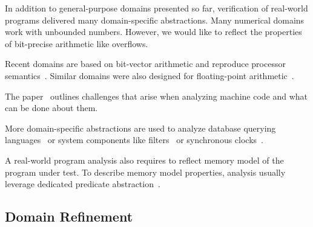 In addition to general-purpose domains presented so far, verification of
real-world programs delivered many domain-specific abstractions. Many numerical
domains work with unbounded numbers. However, we would like to reflect the
properties of bit-precise arithmetic like overflows.

Recent domains are based on bit-vector arithmetic and reproduce processor semantics~\cite{Sharma2013, Sharma2017}. Similar domains were also designed for floating-point arithmetic~\cite{Putot2004}.


The paper~\cite{Reps2010} outlines challenges that arise when analyzing machine code and what can be done about them.

More domain-specific abstractions are used to analyze database querying languages~\cite{Halder2012} or system components like filters~\cite{Feret2004} or synchronous clocks~\cite{Feret2005}.

A real-world program analysis also requires to reflect memory model of the program under test. To describe memory model properties, analysis usually leverage dedicated predicate abstraction~\cite{Dan2013}.

\subsection{Domain Refinement}
\label{sec:domainrefinement}

